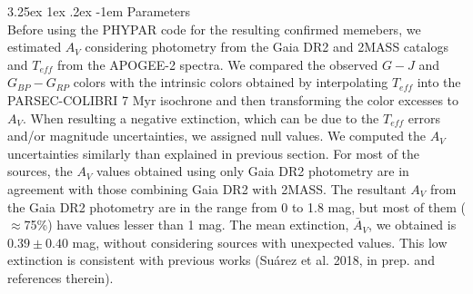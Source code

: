 \documentclass[12pt]{article}
\makeatletter
\renewcommand\paragraph{\@startsection{paragraph}{5}{\z@}%
  {3.25ex \@plus1ex \@minus.2ex}%
  {-1em}%
  {\normalfont\normalsize\bfseries}}
\makeatother
\begin{document}
\paragraph{Parameters\\}
\label{sec_APOGEE-2:parameters}
Before using the PHYPAR code for the resulting confirmed memebers, we estimated $A_V$ considering photometry from the Gaia DR2 and 2MASS catalogs and $T_{eff}$ from the APOGEE-2 spectra. We compared the observed $G-J$ and $G_{BP}-G_{RP}$ colors with the intrinsic colors obtained by interpolating $T_{eff}$ into the PARSEC-COLIBRI 7 Myr isochrone and then transforming the color excesses to $A_V$. When resulting a negative extinction, which can be due to the $T_{eff}$ errors and/or magnitude uncertainties, we assigned null values. We computed the $A_V$ uncertainties similarly than explained in previous section. For most of the sources, the $A_V$ values obtained using only Gaia DR2 photometry are in agreement with those combining Gaia DR2 with 2MASS. The resultant $A_V$ from the Gaia DR2 photometry are in the range from 0 to 1.8 mag, but most of them ($\approx$75\%) have values lesser than 1 mag. The mean extinction, $\bar{A}_V$, we obtained is $0.39\pm0.40$ mag, without considering sources with unexpected values. This low extinction is consistent with previous works (Su\'arez et al. 2018, in prep. and references therein).

\end{document}
